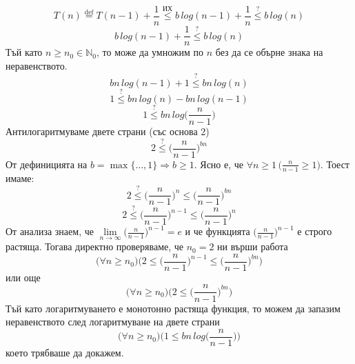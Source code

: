 \begin{solution}
\begin{itemize}
\begin{indstep}
			\begin{equation*}
				T(n)\overset{\text{def}}{=}T(n-1)+\frac1n\overset{\text{ИХ}}{\le}b\,log(n-1)+\frac1n\overset{?}{\le}b\,log(n)
			\end{equation*}
			\begin{equation*}
				b\,log(n-1)+\frac1n\overset{?}{\le}b\,log(n)
			\end{equation*}
			Тъй като $n\ge n_0\in\mathbb{N}_0$, то може да умножим по $n$ без да се обърне знака на неравенството.
			\begin{equation*}
				bn\,log(n-1)+1\overset{?}{\le}bn\,log(n)
			\end{equation*}
			\begin{equation*}
				1\overset{?}{\le}bn\,log(n)-bn\,log(n-1)
			\end{equation*}
			\begin{equation*}
				1\overset{?}{\le}bn\,log\bigg(\frac{n}{n-1}\bigg)
			\end{equation*}
			Антилогаритмуваме двете страни (със основа 2)
			\begin{equation*}
				2\overset{?}{\le}\bigg(\frac{n}{n-1}\bigg)^{bn}
			\end{equation*}
			От дефиницията на $b=\max\{\dots,1\}\Rightarrow b\ge1$. Ясно е, че $\forall n\ge1\,\big(\frac{n}{n-1}\ge1\big)$. Тоест имаме:
			\begin{equation*}
				2\overset{?}{\le}\bigg(\frac{n}{n-1}\bigg)^n\le\bigg(\frac{n}{n-1}\bigg)^{bn}
			\end{equation*}
			\begin{equation*}
				2\overset{?}{\le}\bigg(\frac{n}{n-1}\bigg)^{n-1}\le\bigg(\frac{n}{n-1}\bigg)^n
			\end{equation*}
			От анализа знаем, че $\lim\limits_{n\to\infty}\big(\frac{n}{n-1}\big)^{n-1}=e$ и че функцията $\big(\frac{n}{n-1}\big)^{n-1}$ е строго растяща. Тогава директно проверяваме, че $n_0=2$ ни върши работа%
			\begin{equation*}
				\big(\forall n\ge n_0\big)\Bigg(2\le\bigg(\frac{n}{n-1}\bigg)^{n-1}\le\bigg(\frac{n}{n-1}\bigg)^{bn}\Bigg)
			\end{equation*}
			или още
			\begin{equation*}
				\big(\forall n\ge n_0\big)\Bigg(2\le\bigg(\frac{n}{n-1}\bigg)^{bn}\Bigg)
			\end{equation*}
			Тъй като логаритмуването е монотонно растяща функция, то можем да запазим неравенството след логаритмуване на двете страни
			\begin{equation*}
				\big(\forall n\ge n_0\big)\Bigg(1\le bn\,log\bigg(\frac{n}{n-1}\bigg)\Bigg)
			\end{equation*}
			което трябваше да докажем.
		\end{indstep}
	

\end{itemize}
\end{solution}
